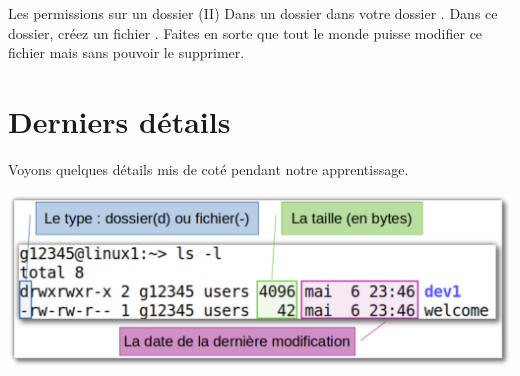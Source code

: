 \documentclass[a4paper,11pt]{style-esi/td}
\begin{document}
		\begin{Exercice}{Les permissions sur un dossier (II)}           
			Dans un dossier  dans votre dossier .
			Dans ce dossier, créez un fichier .
			Faites en sorte que tout le monde puisse modifier ce fichier 
			mais sans pouvoir le supprimer.
		\end{Exercice}

	\section{Derniers détails}

		Voyons quelques détails mis de coté pendant notre apprentissage.

		\begin{center}
			\includegraphics[width=.7\textwidth]{image/reste.pdf}
		\end{center}
\end{document}
